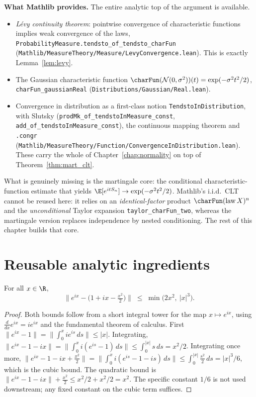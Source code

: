 \medskip

\textbf{What Mathlib provides.} The entire analytic top of the argument is
available.
\begin{itemize}
  \item \emph{L\'evy continuity theorem}: pointwise convergence of characteristic
        functions implies weak convergence of the laws,
        \texttt{ProbabilityMeasure.tendsto\_of\_tendsto\_charFun}
        (\texttt{Mathlib/MeasureTheory/Measure/LevyConvergence.lean}). This is
        exactly Lemma~\ref{lem:levy}.
  \item The Gaussian characteristic function
        $\charFun(\mathcal N(0,\sigma^2))(t)=\exp(-\sigma^2 t^2/2)$,
        \texttt{charFun\_gaussianReal}
        (\texttt{Distributions/Gaussian/Real.lean}).
  \item Convergence in distribution as a first-class notion
        \texttt{TendstoInDistribution}, with Slutsky
        (\texttt{prodMk\_of\_tendstoInMeasure\_const},
        \texttt{add\_of\_tendstoInMeasure\_const}), the continuous mapping theorem
        and \texttt{.congr}
        (\texttt{Mathlib/MeasureTheory/Function/ConvergenceInDistribution.lean}).
        These carry the whole of Chapter~\ref{chap:normality} on top of
        Theorem~\ref{thm:mart_clt}.
\end{itemize}
What is genuinely missing is the martingale core: the conditional
characteristic-function estimate that yields
$\E[e^{itS_n}]\to\exp(-\sigma^2 t^2/2)$. Mathlib's i.i.d.\ CLT cannot be reused
here: it relies on an \emph{identical-factor} product $\charFun(\mathrm{law}\,X)^n$
and the \emph{unconditional} Taylor expansion \texttt{taylor\_charFun\_two},
whereas the martingale version replaces independence by nested conditioning. The
rest of this chapter builds that core.

\section{Reusable analytic ingredients}
\label{sec:pre_clt_analytic}

\begin{lemma}\label{lem:clt_exp_bound}
\leanok
For all $x\in\R$,
\[
  \Big\| e^{ix} - \big(1 + ix - \tfrac{x^2}{2}\big)\Big\|
  \;\le\; \min\!\big(2x^2,\ |x|^3\big).
\]
\end{lemma}

\begin{proof}\leanok
Both bounds follow from a short integral tower for the map $x\mapsto e^{ix}$,
using $\tfrac{d}{dx}e^{ix}=ie^{ix}$ and the fundamental theorem of calculus.
First $\|e^{ix}-1\|=\|\int_0^x i e^{is}\,ds\|\le|x|$. Integrating,
$\|e^{ix}-1-ix\|=\|\int_0^x i(e^{is}-1)\,ds\|\le\int_0^{|x|}s\,ds=x^2/2$.
Integrating once more,
$\|e^{ix}-1-ix+\tfrac{x^2}{2}\|=\|\int_0^x i(e^{is}-1-is)\,ds\|
\le\int_0^{|x|}\tfrac{s^2}{2}\,ds=|x|^3/6$, which is the cubic bound. The
quadratic bound is $\|e^{ix}-1-ix\|+\tfrac{x^2}{2}\le x^2/2+x^2/2=x^2$.
The specific constant $1/6$ is not used downstream; any fixed constant on the
cubic term suffices.
\end{proof}


